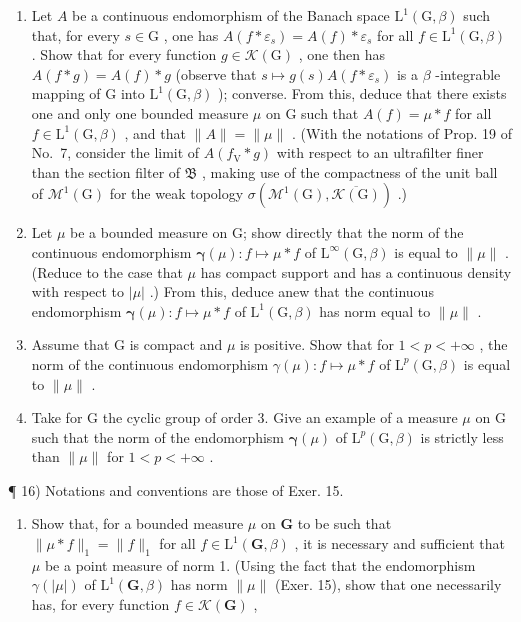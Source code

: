 \begin{enumerate}
\def\labelenumi{\alph{enumi})}
\item
  Let \(A\) be a continuous endomorphism of the Banach space \(\mathrm{L}^1(\mathrm{G},\beta)\) such that, for every \(s \in \mathrm{G}\) , one has \(A(f*\varepsilon_s) = A(f)*\varepsilon_s\) for all \(f \in \mathrm{L}^1(\mathrm{G},\beta)\) . Show that for every function \(g \in \mathcal{K}(\mathrm{G})\) , one then has \(A(f*g) = A(f)*g\) (observe that \(s \mapsto g(s)A(f*\varepsilon_s)\) is a \(\beta\) -integrable mapping of \(\mathrm{G}\) into \(\mathrm{L}^1(\mathrm{G},\beta)\) ); converse. From this, deduce that there exists one and only one bounded measure \(\mu\) on \(\mathrm{G}\) such that \(A(f) = \mu *f\) for all \(f \in \mathrm{L}^1(\mathrm{G},\beta)\) , and that \(\| A\| = \| \mu \|\) . (With the notations of Prop. 19 of No.~7, consider the limit of \(A(f_{\mathrm{V}}*g)\) with respect to an ultrafilter finer than the section filter of \(\mathfrak{B}\) , making use of the compactness of the unit ball of \(\mathcal{M}^1(\mathrm{G})\) for the weak topology \(\sigma (\mathcal{M}^1(\mathrm{G}),\overline{\mathcal{K}(\mathrm{G})})\) .)
\item
  Let \(\mu\) be a bounded measure on G; show directly that the norm of the continuous endomorphism \(\pmb{\gamma}(\mu): f \mapsto \mu * f\) of \(\mathrm{L}^{\infty}(\mathrm{G},\beta)\) is equal to \(\| \mu \|\) . (Reduce to the case that \(\mu\) has compact support and has a continuous density with respect to \(|\mu|\) .) From this, deduce anew that the continuous endomorphism \(\pmb{\gamma}(\mu): f \mapsto \mu * f\) of \(\mathrm{L}^{1}(\mathrm{G},\beta)\) has norm equal to \(\| \mu \|\) .
\item
  Assume that G is compact and \(\mu\) is positive. Show that for \(1 < p < +\infty\) , the norm of the continuous endomorphism \(\gamma(\mu): f \mapsto \mu * f\) of \(\mathrm{L}^{p}(\mathrm{G}, \beta)\) is equal to \(\|\mu\|\) .
\item
  Take for G the cyclic group of order 3. Give an example of a measure \(\mu\) on G such that the norm of the endomorphism \(\pmb{\gamma}(\mu)\) of \(\mathrm{L}^p (\mathrm{G},\beta)\) is strictly less than \(\| \mu \|\) for \(1 < p < +\infty\) .
\end{enumerate}

¶ 16) Notations and conventions are those of Exer. 15.

\begin{enumerate}
\def\labelenumi{\alph{enumi})}
\tightlist
\item
  Show that, for a bounded measure \(\mu\) on \(\mathbf{G}\) to be such that \(\| \mu * f \|_1 = \| f \|_1\) for all \(f \in \mathrm{L}^1(\mathbf{G}, \beta)\) , it is necessary and sufficient that \(\mu\) be a point measure of norm 1. (Using the fact that the endomorphism \(\gamma(|\mu|)\) of \(\mathrm{L}^1(\mathbf{G}, \beta)\) has norm \(\| \mu \|\) (Exer. 15), show that one necessarily has, for every function \(f \in \mathcal{K}(\mathbf{G})\) ,
\end{enumerate}


